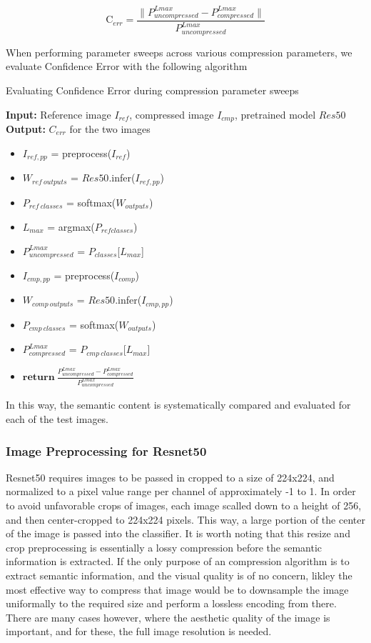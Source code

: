 $$
\textrm{C}_{err} = \frac{\|P^{Lmax}_{uncompressed} - P^{Lmax}_{compressed}\|}{P^{Lmax}_{uncompressed}}
$$

When performing parameter sweeps across various compression parameters, we evaluate Confidence Error with the following algorithm
\begin{algorithm}
    \label{alg:Confidence Error Algorithm}
    \caption{Evaluating Confidence Error during compression parameter sweeps}
    \textbf{Input: } Reference image $I_{ref}$, compressed image $I_{cmp}$, pretrained model $Res50$
    \textbf{Output: } $C_{err}$ for the two images
    \begin{itemize}
        \item $I_{ref, pp}$ = preprocess($I_{ref}$)
        \item $W_{ref \ outputs}$ = $Res50$.infer($I_{ref, pp}$)
        \item $P_{ref \ classes}$ = softmax($W_{outputs}$)
        \item $L_{max}$ = argmax({$P_{ref classes}$})
        \item $P^{Lmax}_{uncompressed}$ = $P_{classes}$[$L_{max}$]
        \item $I_{cmp, pp}$ = preprocess($I_{comp}$)
        \item $W_{comp \ outputs}$ = $Res50$.infer($I_{cmp, pp}$)
        \item $P_{cmp \ classes}$ = softmax($W_{outputs}$)
        \item $P^{Lmax}_{compressed}$ =  $P_{cmp \ classes}$[$L_{max}$]
        \item $\textbf{return}\ \frac{P^{Lmax}_{uncompressed} - P^{Lmax}_{compressed}}{P^{Lmax}_{uncompressed}}$
        \end{itemize}
    \end{algorithm}


In this way, the semantic content is systematically compared and evaluated for each of the test images.

\subsubsection{Image Preprocessing for Resnet50}

Resnet50 requires images to be passed in cropped to a size of 224x224, and normalized to a pixel value range per channel of approximately -1 to 1. In order to avoid unfavorable crops of images, each image scalled down to a height of 256, and then center-cropped to 224x224 pixels. This way, a large portion of the center of the image is passed into the classifier. It is worth noting that this resize and crop preprocessing is essentially a lossy compression before the semantic information is extracted. If the only purpose of an compression algorithm is to extract semantic information, and the visual quality is of no concern, likley the most effective way to compress that image would be to downsample the image uniformally to the required size and perform a lossless encoding from there. There are many cases however, where the aesthetic quality of the image is important, and for these, the full image resolution is needed.

